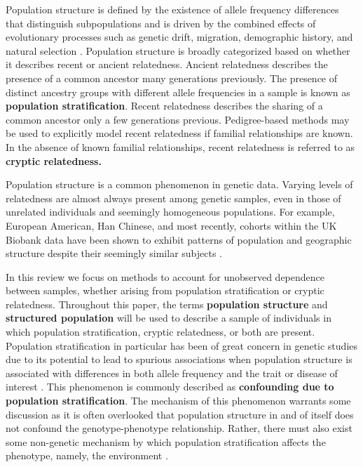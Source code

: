 Population structure is defined by the existence of allele frequency differences that distinguish subpopulations and is driven by the combined effects of evolutionary processes such as genetic drift, migration, demographic history, and natural selection \citep{gibson2015primer, tibayrenc2017genetics}. Population structure is broadly categorized based on whether it describes recent or ancient relatedness. Ancient relatedness describes the presence of a common ancestor many generations previously. The presence of distinct ancestry groups with different allele frequencies in a sample is known as \textbf{population stratification}. Recent relatedness describes the sharing of a common ancestor only a few generations previous. Pedigree-based methods may be used to explicitly model recent relatedness if familial relationships are known. In the absence of known familial relationships, recent relatedness is referred to as \textbf{cryptic relatedness.} 

Population structure is a common phenomenon in genetic data. Varying levels of relatedness are almost always present among genetic samples, even in those of unrelated individuals and seemingly homogeneous populations. For example, European American, Han Chinese, and most recently, cohorts within the UK Biobank data have been shown to exhibit patterns of population and geographic structure despite their seemingly similar subjects \citep{campbell2005demonstrating, xu2009genomic, chen2009genetic, haworth2019apparent}.

In this review we focus on methods to account for unobserved dependence between samples, whether arising from population stratification or cryptic relatedness. Throughout this paper, the terms \textbf{population structure} and \textbf{structured population} will be used to describe a sample of individuals in which population stratification, cryptic relatedness, or both are present. Population stratification in particular has been of great concern in genetic studies due to its potential to lead to spurious associations when population structure is associated with differences in both allele frequency and the trait or disease of interest \citep{gibson2015primer}. This phenomenon is commonly described as \textbf{confounding due to population stratification}. The mechanism of this phenomenon warrants some discussion as it is often overlooked that population structure in and of itself does not confound the genotype-phenotype relationship. Rather, there must also exist some non-genetic mechanism by which population stratification affects the phenotype, namely, the environment \citep{barton2019population, vilhjalmsson2012nature}.


